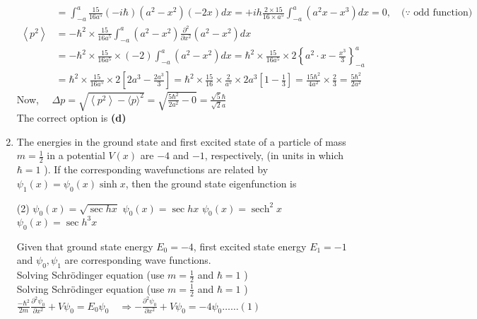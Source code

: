 \begin{enumerate}
\begin{answer}
\begin{align*}
		&=\int_{-a}^{a} \frac{15}{16 a^{5}}(-i \hbar)\left(a^{2}-x^{2}\right)(-2 x) d x=+i h \frac{2 \times 15}{16 \times a^{5}} \int_{-a}^{a}\left(a^{2} x-x^{3}\right) d x=0, \quad(\because \text { odd function) }\\
	\left\langle p^{2}\right\rangle &=-\hbar^{2} \times \frac{15}{16 a^{5}} \int_{-a}^{a}\left(a^{2}-x^{2}\right) \frac{\partial^{2}}{\partial x^{2}}\left(a^{2}-x^{2}\right) d x \\
	&=-\hbar^{2} \times \frac{15}{16 a^{5}} \times(-2) \int_{-a}^{a}\left(a^{2}-x^{2}\right) d x=\hbar^{2} \times \frac{15}{16 a^{5}} \times 2\left\{a^{2} \cdot x-\frac{x^{3}}{3}\right\}_{-a}^{a} \\
	&=\hbar^{2} \times \frac{15}{16 a^{5}} \times 2\left[2 a^{3}-\frac{2 a^{3}}{3}\right]=\hbar^{2} \times \frac{15}{16} \times \frac{2}{a^{5}} \times 2 a^{3}\left[1-\frac{1}{3}\right]=\frac{15 \hbar^{2}}{4 a^{2}} \times \frac{2}{3}=\frac{5 \hbar^{2}}{2 a^{2}}
	\end{align*}
	Now, $\quad \Delta p=\sqrt{\left\langle p^{2}\right\rangle-\langle p\rangle^{2}}=\sqrt{\frac{5 \hbar^{2}}{2 a^{2}}-0}=\frac{\sqrt{5} \hbar}{\sqrt{2} a}$\\
	The correct option is \textbf{(d)}
\end{answer}
	\item The energies in the ground state and first excited state of a particle of mass $m=\frac{1}{2}$ in a potential $V(x)$ are $-4$ and $-1$, respectively, (in units in which $\hbar=1$ ). If the corresponding wavefunctions are related by $\psi_{1}(x)=\psi_{0}(x) \sinh x$, then the ground state eigenfunction is
	{}
\begin{tasks}(2)
	\task[\textbf{A.}] $\psi_{0}(x)=\sqrt{\sec h x}$
	\task[\textbf{B.}]$\psi_{0}(x)=\sec h x$
	\task[\textbf{C.}]$\psi_{0}(x)=\operatorname{sech}^{2} x$
	\task[\textbf{D.}]$\psi_{0}(x)=\sec h^{3} x$
\end{tasks}
\begin{answer}
	Given that ground state energy $E_{0}=-4$, first excited state energy $E_{1}=-1$ and $\psi_{0}, \psi_{1}$ are corresponding wave functions.\\
	Solving Schrödinger equation (use $m=\frac{1}{2}$ and $\hbar=1$ )\\
	Solving Schrödinger equation (use $m=\frac{1}{2}$ and $\hbar=1$ )\\
	$\frac{-\hbar^{2}}{2 m} \frac{\partial^{2} \psi_{0}}{\partial x^{2}}+V \psi_{0}=E_{0} \psi_{0} \quad \Rightarrow-\frac{\partial^{2} \psi_{0}}{\partial x^{2}}+V \psi_{0}=-4 \psi_{0} \ldots \ldots(1)$\\\\

\end{answer}
\end{enumerate}
